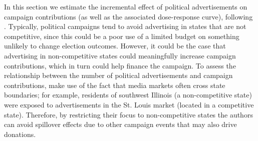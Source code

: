 \documentclass[11pt,twoside]{article}
\theoremstyle{definition}
\theoremstyle{remark}
\begin{document}
In this section we estimate the incremental effect of political advertisements on campaign contributions (as well as the associated dose-response curve), following \cite{urban2014dollars}. Typically, political campaigns tend to avoid advertising in states that are not competitive, since this could be a poor use of a limited budget on something unlikely to change election outcomes. However, it could be the case that advertising in non-competitive states could meaningfully increase campaign contributions, which in turn could help finance the campaign. To assess the relationship between the number of political advertisements and campaign contributions, \cite{urban2014dollars} make use of the fact that media markets often cross state boundaries; for example, residents of southwest Illinois (a non-competitive state) were exposed to advertisements in the St. Louis market (located in a competitive state). Therefore, by restricting their focus to non-competitive states the authors can avoid spillover effects due to other campaign events that may also drive donations.
\end{document}
